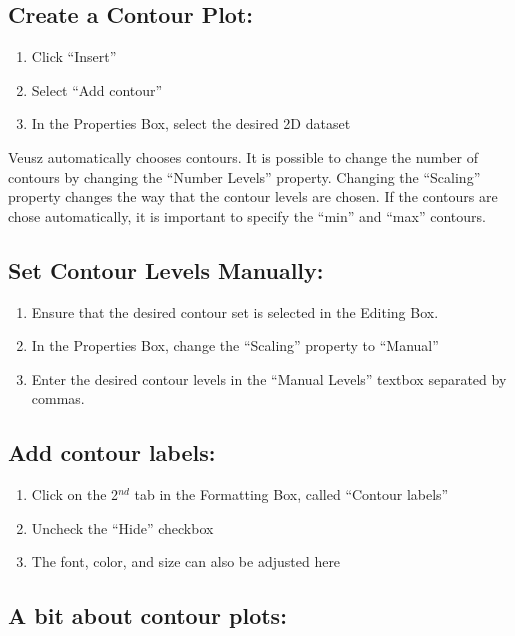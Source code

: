 \subsection{Create a Contour Plot:}

\begin{enumerate}
\item Click ``Insert''
\item Select ``Add contour''
\item In the Properties Box, select the desired 2D dataset
\end{enumerate}

Veusz automatically chooses contours. It is possible to change the number of 
contours by changing the ``Number Levels'' property. Changing the 
``Scaling'' property changes the way that the contour levels are chosen. 
If the contours are chose automatically, it is important to
specify the ``min'' and ``max'' contours.

\subsection{Set Contour Levels Manually:}

\begin{enumerate}
\item Ensure that the desired contour set is selected in the Editing Box.
\item In the Properties Box, change the ``Scaling'' property to ``Manual''
\item Enter the desired contour levels in the ``Manual Levels'' textbox separated by commas.
\end{enumerate}

\subsection{Add contour labels:}

\begin{enumerate}
\item Click on the 2$^{nd}$ tab in the Formatting Box, called ``Contour labels''
\item Uncheck the ``Hide'' checkbox
\item The font, color, and size can also be adjusted here
\end{enumerate}

\subsection{A bit about contour plots:}

